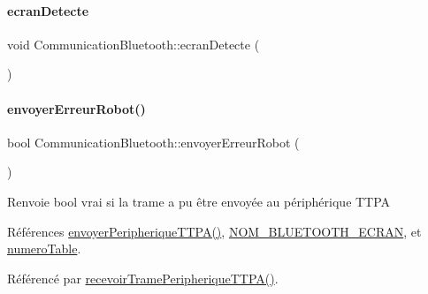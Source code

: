 \paragraph{\texorpdfstring{ecran\+Detecte}{ecranDetecte}}
{\footnotesize\ttfamily void Communication\+Bluetooth\+::ecran\+Detecte (\begin{DoxyParamCaption}{ }\end{DoxyParamCaption})\hspace{0.3cm}{\ttfamily [signal]}}

\mbox{\label{class_communication_bluetooth_a891295407273a810ef9300e743bc34f9}} 
\paragraph{\texorpdfstring{envoyer\+Erreur\+Robot()}{envoyerErreurRobot()}}
{\footnotesize\ttfamily bool Communication\+Bluetooth\+::envoyer\+Erreur\+Robot (\begin{DoxyParamCaption}{ }\end{DoxyParamCaption})}

\begin{DoxyReturn}{Renvoie}
bool vrai si la trame a pu être envoyée au périphérique T\+T\+PA 
\end{DoxyReturn}


Références \hyperlink{class_communication_bluetooth_a73d95b841bf64a4463760435a41fc219}{envoyer\+Peripherique\+T\+T\+P\+A()}, \hyperlink{terminal-_t_t_p_a_2communicationbluetooth_8h_a2bd8beaaf0c4b59979a3f78d4c134ec8}{N\+O\+M\+\_\+\+B\+L\+U\+E\+T\+O\+O\+T\+H\+\_\+\+E\+C\+R\+AN}, et \hyperlink{class_communication_bluetooth_a9428f8261f0cc055e9c6fed9a61cb595}{numero\+Table}.



Référencé par \hyperlink{class_communication_bluetooth_ae50bbbf70a5afdea0a0c4d3322e90e40}{recevoir\+Trame\+Peripherique\+T\+T\+P\+A()}.


